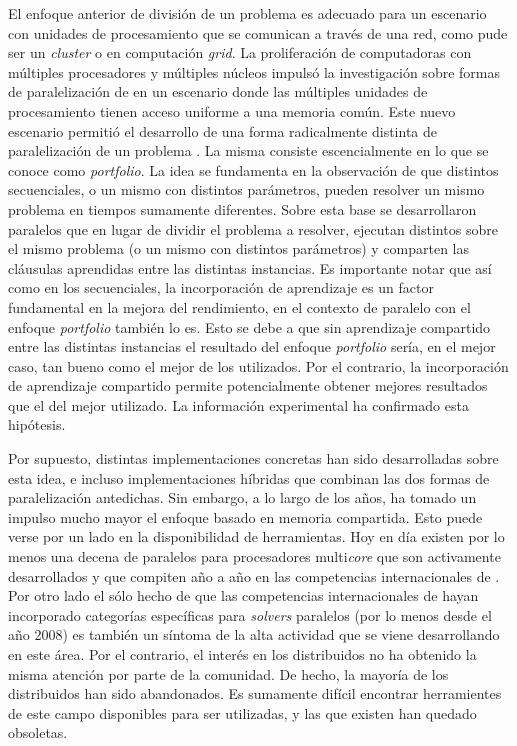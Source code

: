 \newcommand{\pfolio}{\emph{portfolio}\xspace}

El enfoque anterior de división de un problema \sat es adecuado para un
escenario con unidades de procesamiento que se comunican a través de una red,
como pude ser un \emph{cluster} o en computación \emph{grid}. La proliferación
de computadoras con múltiples procesadores y múltiples núcleos impulsó la
investigación sobre formas de paralelización de \ssolvers en un escenario
donde las múltiples unidades de procesamiento tienen acceso uniforme a una
memoria común. Este nuevo escenario permitió el desarrollo de una forma
radicalmente distinta de paralelización de un problema \sat. La misma consiste
escencialmente en lo que se conoce como \pfolio. La idea se fundamenta en la
observación de que distintos \ssolvers secuenciales, o un mismo \ssolver con
distintos parámetros, pueden resolver un mismo problema en tiempos sumamente
diferentes. Sobre esta base se desarrollaron \ssolvers paralelos que en lugar
de dividir el problema a resolver, ejecutan distintos \ssolvers sobre el mismo
problema (o un mismo \ssolver con distintos parámetros\cite{hamadi09}) y
comparten las cláusulas aprendidas entre las distintas instancias. Es
importante notar que así como en los \ssolvers secuenciales, la incorporación
de aprendizaje es un factor fundamental en la mejora del rendimiento, en el
contexto de \ssolving paralelo con el enfoque \pfolio también lo es. Esto se
debe a que sin aprendizaje compartido entre las distintas instancias el
resultado del enfoque \pfolio sería, en el mejor caso, tan bueno como el mejor
de los \ssolvers utilizados. Por el contrario, la incorporación de aprendizaje
compartido permite potencialmente obtener mejores resultados que el del mejor
\ssolver utilizado. La información experimental ha confirmado esta hipótesis.

\newcommand{\mcore}{multi\emph{core}\xspace}
\newcommand{\solvers}{\emph{solvers}\xspace}

Por supuesto, distintas implementaciones concretas han sido desarrolladas
sobre esta idea, e incluso implementaciones híbridas que combinan las dos
formas de paralelización antedichas. Sin embargo, a lo
largo de los años, ha tomado un impulso mucho mayor el enfoque basado en
memoria compartida. Esto puede verse por un lado en la disponibilidad de
herramientas. Hoy en día existen por lo menos una decena de \ssolvers
paralelos para procesadores \mcore que son activamente desarrollados y que
compiten año a año en las competencias internacionales de \ssolving. Por otro
lado el sólo hecho de que las competencias internacionales de \ssolving hayan
incorporado categorías específicas para \solvers paralelos (por lo menos desde
el año 2008) es también un síntoma de la alta actividad que se viene
desarrollando en este área. Por el contrario, el interés en los \ssolvers
distribuidos no ha obtenido la misma atención por parte de la comunidad. De
hecho, la mayoría de los \ssolvers distribuidos han sido abandonados. Es
sumamente difícil encontrar herramientes de este campo disponibles para ser
utilizadas, y las que existen han quedado obsoletas.

